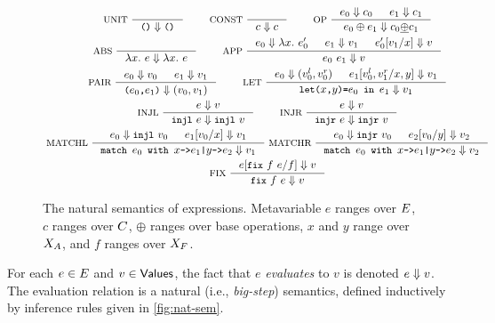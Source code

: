 \begin{figure}
  \centering
  \begin{gather*}
  \inference[ UNIT ]{ }{ \unit \evalsto \unit } \qquad
  \inference[ CONST ]{ }{ c \evalsto c } \qquad
  \inference[ OP ]{ %
    e_0 \evalsto c_0 & %
    e_1 \evalsto c_1 }{ %
    e_0 \oplus e_1 \evalsto c_0 \interp{\oplus} c_1 } \\
  \inference[ ABS ]{ }{ \lambda x.\ e \evalsto \lambda x.\ e } \qquad
  \inference[ APP ]{ %
    e_0 \evalsto \lambda x.\ e_0' & %
    e_1 \evalsto v_1 &
    \replace{ e_0' }{ x }{ v_1 } \evalsto v }{ %
    e_0\ e_1 \evalsto v } \\
  \inference[ PAIR ]{ %
    e_0 \evalsto v_0 & e_1 \evalsto v_1 }{ %
    \pair{ e_0 }{ e_1 } \evalsto (v_0, v_1) } \qquad
  \inference[ LET ]{
    e_0 \evalsto (v_0^l, v_0^r) &
    \replace{ e_1 }{ x, y }{ v_0^l, v_1^r } \evalsto v_1 }{ %
    \letexp{x}{y}{e_0}{e_1} \evalsto v_1 } \\
  \inference[ INJL ]{ e \evalsto v }{ %
    \injl\ e \evalsto \injl\ v } \qquad
  \inference[ INJR ]{ e \evalsto v }{ \injr\ e \evalsto \injr\ v } \\
  \inference[ MATCHL ]{
    e_0 \evalsto \injl\ v_0 &
    \replace{ e_1 }{ x }{ v_0 } \evalsto v_1 }{ %
    \matchexp{ e_0 }{ x }{ e_1 }{ y }{ e_2 } \evalsto v_1 }
  \inference[ MATCHR ]{
    e_0 \evalsto \injr\ v_0 &
    \replace{ e_2 }{ y }{ v_0 } \evalsto v_2 }{ %
    \matchexp{ e_0 }{ x }{ e_1 }{ y }{ e_2 } \evalsto v_2 } \\
  \inference[ FIX ]{ \replace{e}{ f }{ \fix{ f }{ e } } \evalsto v } %
  { \fix{ f }{ e } \evalsto v }
  \end{gather*}
  \caption{The natural semantics of expressions.
    Metavariable $e$ ranges over $E$, %
    $c$ ranges over $C$, %
    $\oplus$ ranges over base operations, %
    $x$ and $y$ range over $X_A$, and %
    $f$ ranges over $X_F$.}
  \label{fig:nat-sem}
\end{figure}
%
For each $e \in E$ and $v \in \mathsf{Values}$, the fact that $e$
\emph{evaluates} to $v$ is denoted $e \Downarrow v$.
% 
The evaluation relation is a natural (i.e., \emph{big-step})
semantics, defined inductively by inference rules given in
\autoref{fig:nat-sem}.

